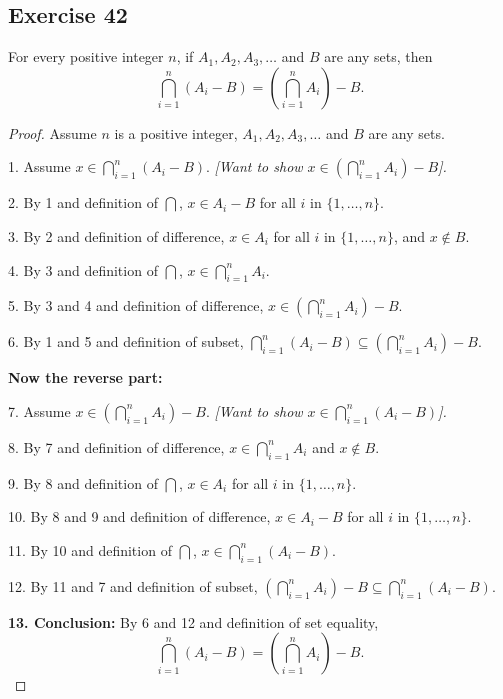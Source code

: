 \documentclass[14pt]{extarticle}
\newcommand{\dps}{\displaystyle}
\begin{document}
\subsection{Exercise 42}
For every positive integer $n$, if \(A_1, A_2, A_3, \ldots\) and $B$ are any sets, then
\[
\bigcap_{i=1}^n (A_i - B) = \left(\bigcap_{i=1}^n A_i\right) - B.
\]
\begin{proof}
Assume $n$ is a positive integer, \(A_1, A_2, A_3, \ldots\) and $B$ are any sets.

1. Assume \(\dps x \in \bigcap_{i=1}^n (A_i - B)\). {\it [Want to show \(\dps x \in \left(\bigcap_{i=1}^n A_i\right) - B\)].}

2. By 1 and definition of \(\dps \bigcap\), \(x \in A_i - B\) for all $i$ in \(\{1, \ldots, n\}\).

3. By 2 and definition of difference, \(x \in A_i\) for all $i$ in \(\{1, \ldots, n\}\), and \(x \notin B\).

4. By 3 and definition of $\dps \bigcap$, \(\dps x \in \bigcap_{i=1}^n A_i\).

5. By 3 and 4 and definition of difference, \(\dps x \in \left(\bigcap_{i=1}^n A_i\right) - B\).

6. By 1 and 5 and definition of subset, \(\dps \bigcap_ {i=1}^n (A_i - B) \subseteq \left(\bigcap_{i=1}^n A_i\right) - B.\)

{\bf Now the reverse part:}

7. Assume \(\dps x \in \left(\bigcap_{i=1}^n A_i\right) - B\). {\it [Want to show \(\dps x \in \bigcap_{i=1}^n (A_i - B)\)].}

8. By 7 and definition of difference, \(\dps x \in \bigcap_{i=1}^n A_i\) and \(x \notin B\).

9. By 8 and definition of $\dps \bigcap$, \(x \in A_i\) for all $i$ in \(\{1, \ldots, n\}\).

10. By 8 and 9 and definition of difference, \(x \in A_i - B\) for all $i$ in \(\{1, \ldots, n\}\).

11. By 10 and definition of $\dps \bigcap$, \(x \in \dps \bigcap_{i=1}^n (A_i - B)\).

12. By 11 and 7 and definition of subset, \(\dps \left( \bigcap_{i=1}^n A_i\right) - B \subseteq \bigcap_{i=1}^n (A_i - B)\).

{\bf 13. Conclusion:} By 6 and 12 and definition of set equality,
\[
\bigcap_{i=1}^n (A_i - B) = \left(\bigcap_{i=1}^n A_i\right) - B.
\]
\end{proof}
\end{document}
